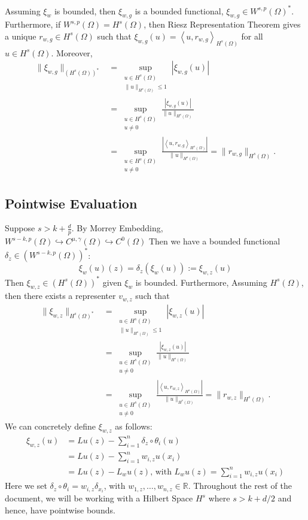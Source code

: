 \documentclass[11pt]{article}
\begin{document}
Assuming $\xi_{w}$ is bounded, then $\xi_{w,g}$ is a bounded functional, $\xi_{w,g} \in W^{s,p}(\Omega)^*$. Furthermore, if $W^{s,p}(\Omega)=H^s(\Omega)$, then Riesz Representation Theorem gives a unique $r_{w,g} \in H^s(\Omega)$ such that $\xi_{w,g}(u) = \left\langle u, r_{w,g} \right\rangle_{H^s(\Omega)}$ for all $u \in H^s(\Omega)$. Moreover,
\begin{align*}
	\| \xi_{w,g} \|_{(H^s(\Omega))^*} &= \sup_{\substack{u \in H^s(\Omega) \\ \| u \|_{H^s(\Omega)} \le 1}} |\xi_{w,g}(u)| \\
	&= \sup_{\substack{u \in H^s(\Omega) \\ u \ne 0}} \frac{|\xi_{w,g}(u)|}{\| u \|_{H^s(\Omega)}} \\
	&= \sup_{\substack{u \in H^s(\Omega) \\ u \ne 0}} \frac{|\left\langle u, r_{w,g} \right\rangle_{H^s(\Omega)}|}{\| u \|_{H^s(\Omega)}} = \| r_{w,g} \|_{H^s(\Omega)}.
\end{align*}

\subsection{Pointwise Evaluation}

Suppose $s > k + \frac{d}{p}$. By Morrey Embedding, $W^{s-k,p}(\Omega) \hookrightarrow C^{\mu,\gamma}(\Omega) \hookrightarrow C^{0}(\Omega)$  Then we have a bounded functional $\delta_z \in \left(W^{s-k,p}(\Omega) \right)^*$:
\begin{equation}
	\xi_{w}(u)(z) = \delta_z \left( \xi_{w} (u) \right) := \xi_{w,z} (u)
\end{equation}
Then $\xi_{w,z} \in (H^s(\Omega))^*$ given $\xi_{w}$ is bounded. Furthermore, Assuming $H^s(\Omega)$, then there exists a representer $v_{w,z}$ such that
\begin{align*}
	\| \xi_{w,z} \|_{H^s(\Omega)^*} &= \sup_{\substack{u \in H^s(\Omega) \\ \| u \|_{H^s(\Omega)} \le 1}} |\xi_{w,z}(u)| \\
	&= \sup_{\substack{u \in H^s(\Omega) \\ u \ne 0}} \frac{|\xi_{w,z}(u)|}{\| u \|_{H^s(\Omega)}} \\
	&= \sup_{\substack{u \in H^s(\Omega) \\ u \ne 0}} \frac{|\left\langle u, r_{w,z} \right\rangle_{H^s(\Omega)}|}{\| u \|_{H^s(\Omega)}} = \| r_{w,z} \|_{H^s(\Omega)}.
\end{align*}
We can concretely define $\xi_{w,z}$ as follows:
\begin{align*}
	\xi_{w,z}(u) &= Lu(z) - \sum_{i=1}^n \delta_z \circ\theta_i(u)\\
	&= Lu(z) - \sum_{i=1}^n w_{i,z} u(x_i)\\
	&= Lu(z) - L_w u(z) \text{, with } L_w u(z) = \sum_{i=1}^n w_{i,z} u(x_i)
\end{align*}
Here we set $\delta_z \circ \theta_{i} = w_{i,z} \delta_{x_i}$, with $w_{1,z}, \hdots, w_{n,z} \in \mathbb{R}$. Throughout the rest of the document, we will be working with a Hilbert Space $H^s$ where $s > k+d/2$ and hence, have pointwise bounds.
\end{document}
